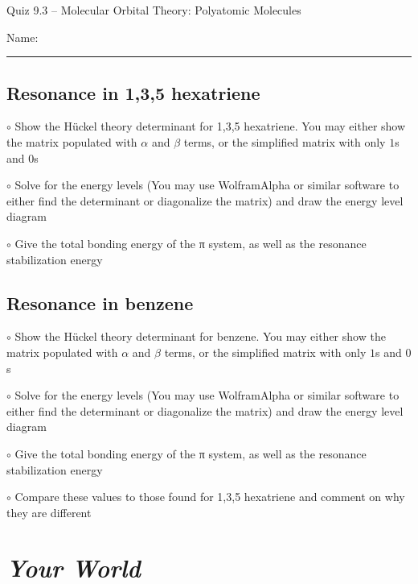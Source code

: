 \documentclass[11pt, letterpaper]{memoir}
\begin{document}
\begin{center}
	{\large Quiz 9.3 -- Molecular Orbital Theory: Polyatomic Molecules}
\end{center}
{\large Name: \rule[-1mm]{4in}{.1pt}}

\subsection*{Resonance in 1,3,5 hexatriene}
$\circ$ Show the H\"uckel theory determinant for 1,3,5 hexatriene. You may either show the matrix populated with $\alpha$ and $\beta$ terms, or the simplified matrix with only $1$s and $0$s

\vspace{22em}

\noindent$\circ$ Solve for the energy levels (You may use WolframAlpha or similar software to either find the determinant or diagonalize the matrix) and draw the energy level diagram

\vspace{15em}
\noindent $\circ$ Give the total bonding energy of the π system, as well as the resonance stabilization energy

\newpage
\subsection*{Resonance in benzene}
$\circ$ Show the H\"uckel theory determinant for benzene. You may either show the matrix populated with $\alpha$ and $\beta$ terms, or the simplified matrix with only $1$s and $0$s

\vspace{22em}

\noindent$\circ$ Solve for the energy levels (You may use WolframAlpha or similar software to either find the determinant or diagonalize the matrix) and draw the energy level diagram

\vspace{15em}
\noindent $\circ$ Give the total bonding energy of the π system, as well as the resonance stabilization energy

\vspace{5em}
\noindent $\circ$ Compare these values to those found for 1,3,5 hexatriene and comment on why they are different

\newpage
\pagestyle{empty}
\addtocounter{page}{-1}
\section*{\emph{Your World}}
\end{document}
